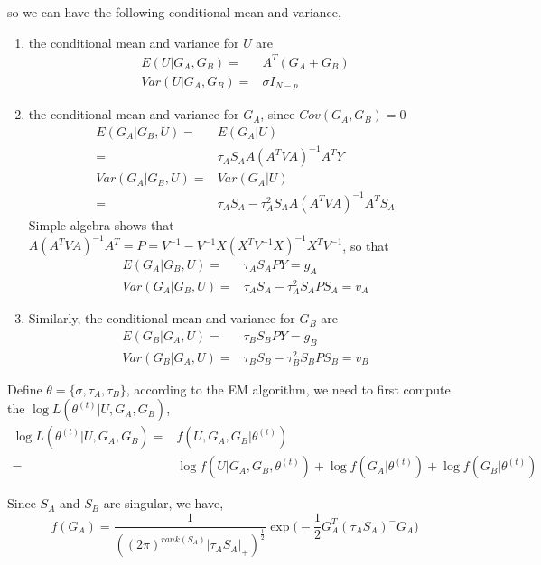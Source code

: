 \documentclass{article}
\begin{document}
    so we can have the following conditional mean and variance,
    \begin{enumerate}
        \item the conditional mean and variance for $U$ are
            \[\begin{split}
                E(U|G_A,G_B)=&A^T(G_A+G_B)\\
                Var(U|G_A,G_B) = & \sigma I_{N-p}
            \end{split}\]
        \item the conditional mean and variance for $G_A$, since $Cov(G_A,G_B)=0$
            \[\begin{split}
                E(G_A|G_B,U)=&E(G_A|U)\\
                                           =&\tau_AS_AA(A^TVA)^{-1}A^TY\\
                Var(G_A|G_B,U)=&Var(G_A|U)\\
                                               =&\tau_AS_A-\tau_A^2S_AA(A^TVA)^{-1}A^TS_A
            \end{split}\]
            Simple algebra shows that $A(A^TVA)^{-1}A^T=P=V^{-1}-V^{-1}X(X^TV^{-1}X)^{-1}X^TV^{-1}$, so that
            \[\begin{split}
                E(G_A|G_B,U)=&\tau_AS_APY=g_A\\
                Var(G_A|G_B,U)=&\tau_AS_A-\tau_A^2S_APS_A=v_A
            \end{split}\]
        \item Similarly, the conditional mean and variance for $G_B$ are
             \[\begin{split}
                E(G_B|G_A,U)=&\tau_BS_BPY=g_B\\
                Var(G_B|G_A,U)=&\tau_BS_B-\tau_B^2S_BPS_B=v_B
            \end{split}\]
    \end{enumerate}

    Define $\theta=\{\sigma,\tau_A,\tau_B\}$, according to the EM algorithm, we need to first compute the $\log L(\theta^{(t)}|U,G_A,G_B)$,
    \[\begin{split}
        \log L(\theta^{(t)}|U,G_A,G_B)=&f(U,G_A,G_B|\theta^{(t)})\\
                                                                 =&\log f(U|G_A,G_B,\theta^{(t)})+\log f(G_A|\theta^{(t)})+\log f(G_B|\theta^{(t)})
    \end{split}\]

    Since $S_A$ and $S_B$ are singular, we have,
    \[
        f(G_A)=\dfrac{1}{((2\pi)^{rank(S_A)}|\tau_AS_A|_+)^{\frac{1}{2}}}\exp\Big (-\dfrac{1}{2}G_A^T(\tau_AS_A)^-G_A\Big)
    \]
\end{document}
